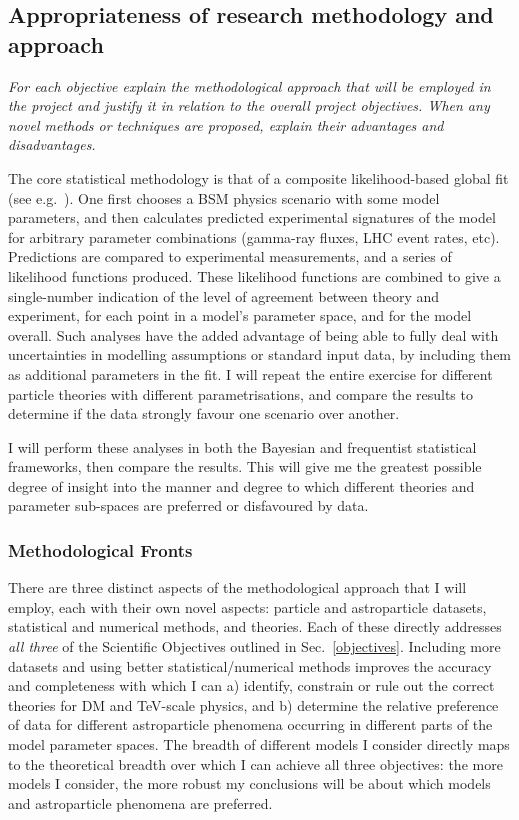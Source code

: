 \documentclass[a4paper,11pt]{article}
\newenvironment{xcomment}{\em}{}
\begin{document}
\subsection{Appropriateness of research methodology and approach}

\begin{xcomment}
For each objective explain the methodological approach that will be
employed in the project and justify it in relation to the overall
project objectives. When any novel methods or techniques are proposed,
explain their advantages and disadvantages.
\end{xcomment}

The core statistical methodology is that of a composite likelihood-based global fit (see e.g.~\cite{Trotta08,Akrami09,Scott09c}).  One first chooses a BSM physics scenario with some model parameters, and then calculates predicted experimental signatures of the model for arbitrary parameter combinations (gamma-ray fluxes, LHC event rates, etc).  Predictions are compared to experimental measurements, and a series of likelihood functions produced.  These likelihood functions are combined to give a single-number indication of the level of agreement between theory and experiment, for each point in a model's parameter space, and for the model overall.
Such analyses have the added advantage of being able to fully deal with uncertainties in modelling assumptions or standard input data, by including them as additional parameters in the fit.  I will repeat the entire exercise for different particle theories with different parametrisations, and compare the results to determine if the data strongly favour one scenario over another.  

I will perform these analyses in both the Bayesian and frequentist statistical frameworks, then compare the results.  This will give me the greatest possible degree of insight into the manner and degree to which different theories and parameter sub-spaces are preferred or disfavoured by data.

\subsubsection{Methodological Fronts}

There are three distinct aspects of the methodological approach that I will employ, each with their own novel aspects: particle and astroparticle datasets, statistical and numerical methods, and theories.  Each of these directly addresses {\it all three} of the Scientific Objectives outlined in Sec.\ \ref{objectives}.  Including more datasets and using better statistical/numerical methods improves the accuracy and completeness with which I can a) identify, constrain or rule out the correct theories for DM and TeV-scale physics, and b) determine the relative preference of data for different astroparticle phenomena occurring in different parts of the model parameter spaces.  The breadth of different models I consider directly maps to the theoretical breadth over which I can achieve all three objectives: the more models I consider, the more robust my conclusions will be about which models and astroparticle phenomena are preferred.
\end{document}
